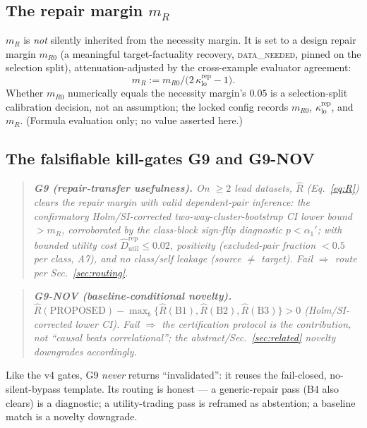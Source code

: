 \documentclass[11pt]{article}
\theoremstyle{plain}
\theoremstyle{definition}
\newcommand{\Rhat}{\widehat{R}}
\newcommand{\Dutilr}{\widehat{D}^{\mathrm{rep}}_{\mathrm{util}}}
\begin{document}
\subsection{The repair margin $m_R$}\label{sec:method:margin}

$m_R$ is \emph{not} silently inherited from the necessity margin. It is set to a
design repair margin $m_{R0}$ (a meaningful target-factuality recovery,
\textsc{data\_needed}, pinned on the selection split), attenuation-adjusted by the
cross-example evaluator agreement:
\begin{equation}
m_R := m_{R0}\big/\big(2\,\kappa^{\mathrm{rep}}_{\mathrm{lo}}-1\big).
\label{eq:mR}
\end{equation}
Whether $m_{R0}$ numerically equals the necessity margin's $0.05$ is a selection-split
calibration decision, not an assumption; the locked config records $m_{R0}$,
$\kappa^{\mathrm{rep}}_{\mathrm{lo}}$, and $m_R$. (Formula evaluation only; no value
asserted here.)

\subsection{The falsifiable kill-gates G9 and G9-NOV}\label{sec:method:g9}

\begin{quote}\itshape
\textbf{G9 (repair-transfer usefulness).} On $\ge2$ lead datasets, $\Rhat$
(Eq.~\ref{eq:R}) clears the repair margin with valid dependent-pair inference:
the \emph{confirmatory} Holm/SI-corrected two-way-cluster-bootstrap CI lower bound
$>m_R$, corroborated by the class-block sign-flip \emph{diagnostic} $p<\alpha_1'$;
with bounded utility cost $\Dutilr\le0.02$,
positivity (excluded-pair fraction $<0.5$ per class, A7), and no class/self leakage
(source $\ne$ target). Fail $\Rightarrow$ route per Sec.~\ref{sec:routing}.
\end{quote}
\begin{quote}\itshape
\textbf{G9-NOV (baseline-conditional novelty).}
$\Rhat(\text{PROPOSED})-\max_b\{\Rhat(\text{B1}),\Rhat(\text{B2}),\Rhat(\text{B3})\}>0$
(Holm/SI-corrected lower CI). Fail $\Rightarrow$ the certification protocol is the
contribution, not ``causal beats correlational''; the abstract/Sec.~\ref{sec:related}
novelty downgrades accordingly.
\end{quote}
Like the v4 gates, G9 \emph{never} returns ``invalidated'': it reuses the
fail-closed, no-silent-bypass template. Its routing is honest --- a generic-repair
pass (B4 also clears) is a \textsf{diagnostic}; a utility-trading pass is reframed as
abstention; a baseline match is a novelty downgrade.
\end{document}
